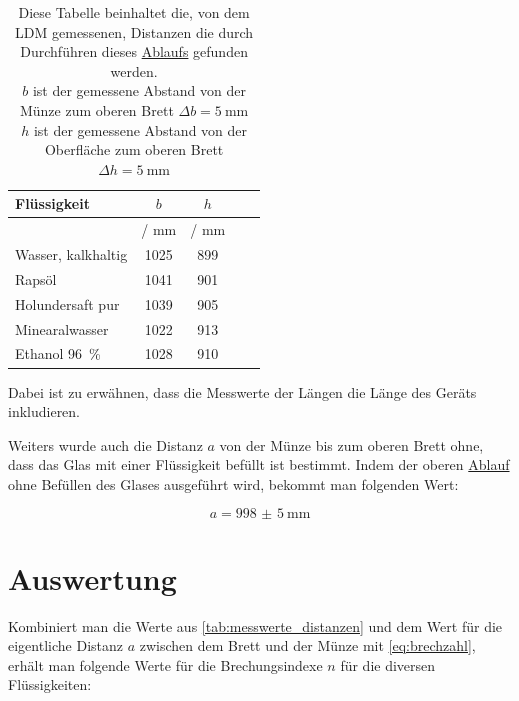 \documentclass[11pt,ngerman]{scrartcl}
\begin{document}
\begin{table}[H]
    \centering
    \caption{
        Diese Tabelle beinhaltet die, von dem LDM gemessenen, Distanzen die
        durch Durchführen dieses \hyperref[en:Ablauf]{Ablaufs} gefunden werden.\\ 
        $b$ ist der gemessene Abstand von der Münze zum oberen Brett $\Delta b=\SI{5}{\mm}$ \\
        $h$ ist der gemessene Abstand von der Oberfläche zum oberen Brett $\Delta h = \SI{5}{\mm}$\\
    }
    \label{tab:messwerte_distanzen}
    \begin{tabular}{l|S|S|S|S}
        Flüssigkeit        & {$b$}        & {$h$}        \\ \hline
        {}                 & {/ \si{\mm}} & {/ \si{\mm}} \\ \hline \hline
        Wasser, kalkhaltig & 1025         & 899          \\
        Rapsöl             & 1041         & 901          \\
        Holundersaft pur   & 1039         & 905          \\
        Minearalwasser    & 1022         & 913          \\
        Ethanol \SI{96}{\percent} & 1028         & 910          \\
    \end{tabular}
\end{table}

Dabei ist zu erwähnen, dass die Messwerte der Längen die Länge des Geräts inkludieren.

Weiters wurde auch die Distanz $a$ von der Münze bis zum oberen Brett ohne, dass das Glas
mit einer Flüssigkeit befüllt ist bestimmt. Indem der oberen \hyperref[en:Ablauf]{Ablauf}
ohne Befüllen des Glases ausgeführt wird, bekommt man folgenden Wert:

\begin{equation}
    a = \SI{998(5)}{\mm}
\end{equation}



\section{Auswertung}
\label{sec:auswertung}

Kombiniert man die Werte aus \autoref{tab:messwerte_distanzen} und dem Wert für die
eigentliche Distanz $a$ zwischen dem Brett und der Münze mit
\autoref{eq:brechzahl}, erhält man folgende Werte für die Brechungsindexe $n$ für die
diversen Flüssigkeiten:
\end{document}
